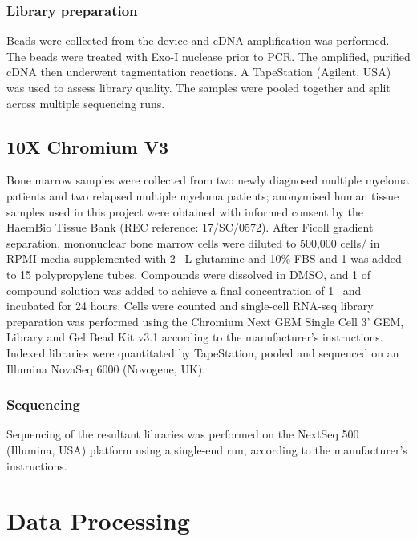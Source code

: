 \subsubsection{Library preparation}
Beads were collected from the device and cDNA amplification was performed.
The beads were treated with Exo-I nuclease prior to PCR.
The amplified, purified cDNA then underwent tagmentation reactions.
A TapeStation (Agilent, USA) was used to assess library quality.
The samples were pooled together and split across multiple sequencing runs.

\subsection{10X Chromium V3}\label{subsec:10x_method}
Bone marrow samples were collected from two newly diagnosed multiple myeloma patients and two relapsed multiple myeloma patients;
anonymised human tissue samples used in this project were obtained with informed consent by the HaemBio Tissue Bank (REC reference: 17/SC/0572).
After Ficoll gradient separation, mononuclear bone marrow cells were diluted to 500,000 cells/\ml{} in RPMI media supplemented with 2\si{\milli\Molar}
L-glutamine and 10\% FBS and 1\ml{} was added to 15\ml{} polypropylene tubes.
Compounds were dissolved in DMSO, and 1\ul{} of compound solution was added to achieve a final concentration of 1\si{\micro\Molar} and incubated for 24 hours.
Cells were counted and single-cell RNA-seq library preparation was performed using the Chromium Next GEM Single Cell 3' GEM, Library and Gel Bead Kit v3.1 according to the manufacturer's instructions.
Indexed libraries were quantitated by TapeStation, pooled and sequenced on an Illumina NovaSeq 6000 (Novogene, UK).

\subsubsection{Sequencing}
Sequencing of the resultant libraries was performed on the NextSeq 500 (Illumina, USA) platform using a single-end run, according to the manufacturer's instructions.

%

\section{Data Processing}\label{sec:data_processing}

